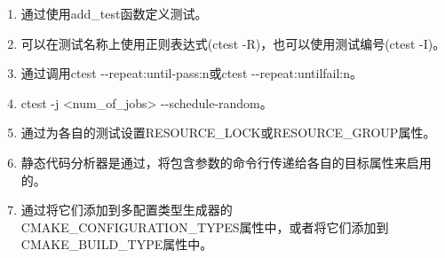 

\begin{enumerate}
\item 
通过使用add\_test函数定义测试。

\item
可以在测试名称上使用正则表达式(ctest -R)，也可以使用测试编号(ctest -I)。

\item 
通过调用ctest -{}-repeat:until-pass:n或ctest -{}-repeat:untilfail:n。

\item 
ctest -j <num\_of\_jobs> -{}-schedule-random。

\item 
通过为各自的测试设置RESOURCE\_LOCK或RESOURCE\_GROUP属性。

\item 
静态代码分析器是通过，将包含参数的命令行传递给各自的目标属性来启用的。

\item 
通过将它们添加到多配置类型生成器的CMAKE\_CONFIGURATION\_TYPES属性中，或者将它们添加到CMAKE\_BUILD\_TYPE属性中。
\end{enumerate}